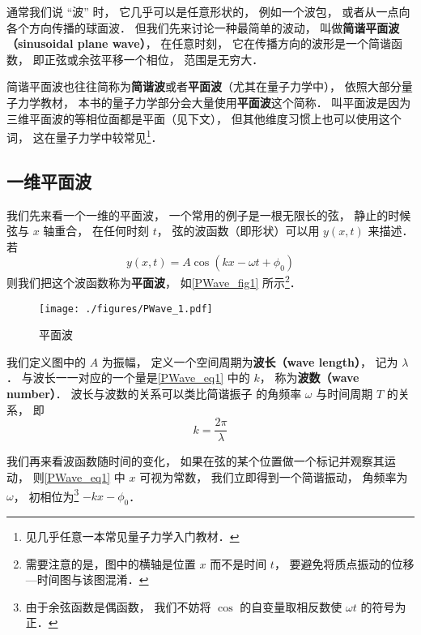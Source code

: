 

通常我们说 “波” 时， 它几乎可以是任意形状的， 例如一个波包， 或者从一点向各个方向传播的球面波． 但我们先来讨论一种最简单的波动， 叫做\textbf{简谐平面波（sinusoidal plane wave）}， 在任意时刻， 它在传播方向的波形是一个简谐函数， 即正弦或余弦平移一个相位， 范围是无穷大．

简谐平面波也往往简称为\textbf{简谐波}或者\textbf{平面波}（尤其在量子力学中）， 依照大部分量子力学教材， 本书的量子力学部分会大量使用\textbf{平面波}这个简称． 叫平面波是因为三维平面波的等相位面都是平面（见下文）， 但其他维度习惯上也可以使用这个词， 这在量子力学中较常见\footnote{见几乎任意一本常见量子力学入门教材．}．

\subsection{一维平面波}
我们先来看一个一维的平面波， 一个常用的例子是一根无限长的弦， 静止的时候弦与 $x$ 轴重合， 在任何时刻 $t$， 弦的波函数（即形状）可以用 $y(x, t)$ 来描述． 若
\begin{equation}\label{PWave_eq1}
y(x, t) = A\cos(k x - \omega t + \phi_0)
\end{equation}
则我们把这个波函数称为\textbf{平面波}， 如\autoref{PWave_fig1} 所示\footnote{需要注意的是，图中的横轴是位置 $x$ 而不是时间 $t$， 要避免将质点振动的位移—时间图与该图混淆．}．

\begin{figure}[ht]
\centering
\texttt{[image: ./figures/PWave\_1.pdf]}
\caption{平面波} \label{PWave_fig1}
\end{figure}

我们定义图中的 $A$ 为振幅， 定义一个空间周期为\textbf{波长（wave length）}， 记为 $\lambda$． 与波长一一对应的一个量是\autoref{PWave_eq1} 中的 $k$， 称为\textbf{波数（wave number）}． 波长与波数的关系可以类比简谐振子 的角频率 $\omega$ 与时间周期 $T$ 的关系， 即
\begin{equation}\label{PWave_eq2}
k = \frac{2\pi}{\lambda}
\end{equation}

我们再来看波函数随时间的变化， 如果在弦的某个位置做一个标记并观察其运动， 则\autoref{PWave_eq1} 中 $x$ 可视为常数， 我们立即得到一个简谐振动， 角频率为 $\omega$， 初相位为\footnote{由于余弦函数是偶函数， 我们不妨将 $\cos$ 的自变量取相反数使 $\omega t$ 的符号为正．} $-kx - \phi_0$．

